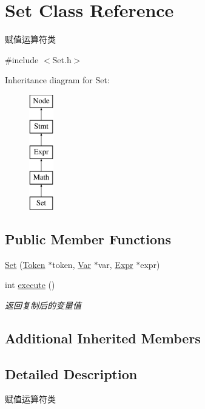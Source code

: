 \hypertarget{class_set}{}\section{Set Class Reference}
\label{class_set}


赋值运算符类  




{\ttfamily \#include $<$Set.\+h$>$}

Inheritance diagram for Set\+:\begin{figure}[H]
\begin{center}
\leavevmode
\includegraphics[height=5.000000cm]{class_set}
\end{center}
\end{figure}
\subsection*{Public Member Functions}
\begin{DoxyCompactItemize}
\item 
\hyperlink{class_set_a05474c6de277894bcebe5230c587efab}{Set} (\hyperlink{class_token}{Token} $\ast$token, \hyperlink{class_var}{Var} $\ast$var, \hyperlink{class_expr}{Expr} $\ast$expr)
\item 
\mbox{\label{class_set_a7776ba36f3af8b09772b36927beb5f5c}} 
int \hyperlink{class_set_a7776ba36f3af8b09772b36927beb5f5c}{execute} ()
\begin{DoxyCompactList}\small\item\em 返回复制后的变量值 \end{DoxyCompactList}\end{DoxyCompactItemize}
\subsection*{Additional Inherited Members}


\subsection{Detailed Description}
赋值运算符类 

